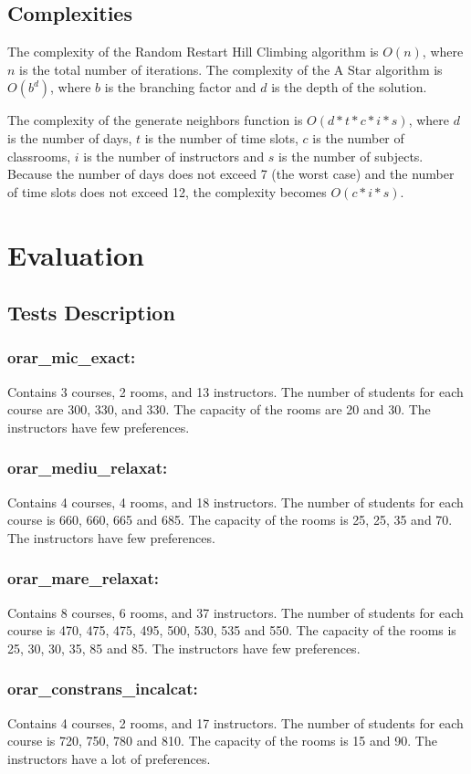 \documentclass[runningheads]{paper}
\begin{document}
\subsection{Complexities}
The complexity of the Random Restart Hill Climbing algorithm is $O(n)$, where
$n$ is the total number of iterations. The complexity of the A Star algorithm is
$O(b^d)$, where $b$ is the branching factor and $d$ is the depth of the solution.

The complexity of the generate neighbors function is $O(d*t*c*i*s)$, where $d$ is
the number of days, $t$ is the number of time slots, $c$ is the number of classrooms,
$i$ is the number of instructors and $s$ is the number of subjects. Because the number
of days does not exceed 7 (the worst case) and the number of time slots does not exceed 12, 
the complexity becomes $O(c*i*s)$.

\section{Evaluation}
\subsection{Tests Description}

\subsubsection{orar\_mic\_exact:} Contains 3 courses, 2 rooms, and 13 instructors. The
number of students for each course are 300, 330, and 330. The capacity of the rooms are
20 and 30. The instructors have few preferences.
\subsubsection{orar\_mediu\_relaxat:} Contains 4 courses, 4 rooms, and 18 instructors. The
number of students for each course is 660, 660, 665 and 685. The capacity of the rooms is
25, 25, 35 and 70. The instructors have few preferences.
\subsubsection{orar\_mare\_relaxat:} Contains 8 courses, 6 rooms, and 37 instructors. The
number of students for each course is 470, 475, 475, 495, 500, 530, 535 and 550. The capacity of the rooms is
25, 30, 30, 35, 85 and 85. The instructors have few preferences.
\subsubsection{orar\_constrans\_incalcat:} Contains 4 courses, 2 rooms, and 17 instructors. The
number of students for each course is 720, 750, 780 and 810. The capacity of the rooms is
15 and 90. The instructors have a lot of preferences.
\end{document}
